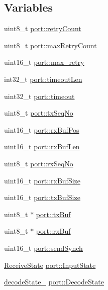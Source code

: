 \subsection*{\-Variables}
\begin{DoxyCompactItemize}
\item 
uint8\-\_\-t \hyperlink{group___uploader_gaa59e48abe3c6ec88333502c7abd9c309}{port\-::retry\-Count}
\item 
uint8\-\_\-t \hyperlink{group___uploader_ga39fea4d573ab6d52b3b2df145d6d3f7a}{port\-::max\-Retry\-Count}
\item 
uint16\-\_\-t \hyperlink{group___uploader_ga6a20c78337e965260038e132527ba852}{port\-::max\-\_\-retry}
\item 
int32\-\_\-t \hyperlink{group___uploader_gacad18aa8d7e13c6500409da966437d3d}{port\-::timeout\-Len}
\item 
uint32\-\_\-t \hyperlink{group___uploader_gac5f404a47ec2583f83bd610d5f184308}{port\-::timeout}
\item 
uint8\-\_\-t \hyperlink{group___uploader_ga9add555476b07ac554ed3371358848bb}{port\-::tx\-Seq\-No}
\item 
uint16\-\_\-t \hyperlink{group___uploader_ga75073512a14d809c8ed03df447815d09}{port\-::rx\-Buf\-Pos}
\item 
uint16\-\_\-t \hyperlink{group___uploader_ga1de477395cd5f7c06623860c2d8017e4}{port\-::rx\-Buf\-Len}
\item 
uint8\-\_\-t \hyperlink{group___uploader_ga82ee05e7b1de6f1b55b375364ce5bc83}{port\-::rx\-Seq\-No}
\item 
uint16\-\_\-t \hyperlink{group___uploader_ga640561a803c92539943ec445afba5e72}{port\-::rx\-Buf\-Size}
\item 
uint16\-\_\-t \hyperlink{group___uploader_ga108da44374d16b8153824a65fec5a7ae}{port\-::tx\-Buf\-Size}
\item 
uint8\-\_\-t $\ast$ \hyperlink{group___uploader_gaf025f7e1a7f2a73bbc14602b9a5f1ee0}{port\-::tx\-Buf}
\item 
uint8\-\_\-t $\ast$ \hyperlink{group___uploader_ga934f922079e3cc67b83f3b27d377a1e4}{port\-::rx\-Buf}
\item 
uint16\-\_\-t \hyperlink{group___uploader_gafc6af17b7bd943cd40a0223eed26a0c3}{port\-::send\-Synch}
\item 
\hyperlink{group___uploader_gab10fc109fdda19fca8e7faf999d5a342}{\-Receive\-State} \hyperlink{group___uploader_ga4e66fb46404301e2985093c34ae57379}{port\-::\-Input\-State}
\item 
\hyperlink{group___uploader_gaca51c380bc924bd9e5d794ce37ec7194}{decode\-State\-\_\-} \hyperlink{group___uploader_gac689b116d4d7c80713d964bd631e9511}{port\-::\-Decode\-State}

\end{DoxyCompactItemize}
